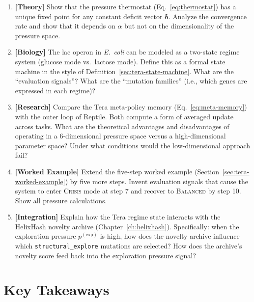 \begin{enumerate}[label=\textbf{9.\arabic*.}, leftmargin=2.5em]
\item \textbf{[Theory]} Show that the pressure thermostat (Eq.~\eqref{eq:thermostat}) has a unique fixed point for any constant deficit vector $\boldsymbol{\delta}$. Analyze the convergence rate and show that it depends on $\alpha$ but not on the dimensionality of the pressure space.

\item \textbf{[Biology]} The lac operon in \emph{E.~coli} can be modeled as a two-state regime system (glucose mode vs.\ lactose mode). Define this as a formal state machine in the style of Definition~\ref{sec:tera-state-machine}. What are the ``evaluation signals''? What are the ``mutation families'' (i.e., which genes are expressed in each regime)?

\item \textbf{[Research]} Compare the Tera meta-policy memory (Eq.~\eqref{eq:meta-memory}) with the outer loop of Reptile. Both compute a form of averaged update across tasks. What are the theoretical advantages and disadvantages of operating in a 6-dimensional pressure space versus a high-dimensional parameter space? Under what conditions would the low-dimensional approach fail?

\item \textbf{[Worked Example]} Extend the five-step worked example (Section~\ref{sec:tera-worked-example}) by five more steps. Invent evaluation signals that cause the system to enter \textsc{Crisis} mode at step 7 and recover to \textsc{Balanced} by step 10. Show all pressure calculations.

\item \textbf{[Integration]} Explain how the Tera regime state interacts with the HelixHash novelty archive (Chapter~\ref{ch:helixhash}). Specifically: when the exploration pressure $p^{(\text{exp})}$ is high, how does the novelty archive influence which \texttt{structural\_explore} mutations are selected? How does the archive's novelty score feed back into the exploration pressure signal?

\end{enumerate}

\section{Key Takeaways}

